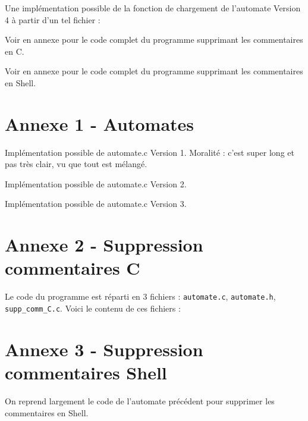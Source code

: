 \documentclass[10pt]{article}
\begin{document}
\begin{enumerate}[label=\textbf{[\alph*]}]
  Une implémentation possible de la fonction de chargement de
  l'automate Version 4 à partir d'un tel fichier :

  

\item Voir en annexe pour le code complet du programme supprimant les
  commentaires en C.

\item Voir en annexe pour le code complet du programme supprimant les
  commentaires en Shell.

\end{enumerate}

\newpage
\section*{Annexe 1 - Automates}
  Implémentation possible de automate.c Version 1. Moralité : c'est
  super long et pas très clair, vu que tout est mélangé.

  

  \vspace{1cm}
  Implémentation possible de automate.c Version 2.

  

  \vspace{1cm}
  Implémentation possible de automate.c Version 3.

  

  \newpage
  \section*{Annexe 2 - Suppression commentaires C}
  Le code du programme est réparti en 3 fichiers :
  \texttt{automate.c}, \texttt{automate.h},
  \texttt{supp\_comm\_C.c}. Voici le contenu de ces fichiers :

  
  

  \newpage
  

  \newpage
  \section*{Annexe 3 - Suppression commentaires Shell}
  On reprend largement le code de l'automate précédent pour supprimer
  les commentaires en Shell.

  
  

  \newpage
  
\end{document}

